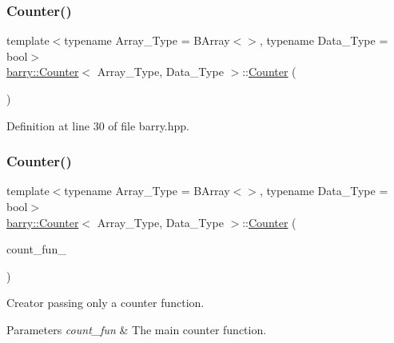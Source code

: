 \subsubsection{\texorpdfstring{Counter()}{Counter()}\hspace{0.1cm}{\footnotesize\ttfamily [1/3]}}
{\footnotesize\ttfamily template$<$typename Array\+\_\+\+Type  = B\+Array$<$$>$, typename Data\+\_\+\+Type  = bool$>$ \\
\hyperlink{classbarry_1_1_counter}{barry\+::\+Counter}$<$ Array\+\_\+\+Type, Data\+\_\+\+Type $>$\+::\hyperlink{classbarry_1_1_counter}{Counter} (\begin{DoxyParamCaption}{ }\end{DoxyParamCaption})\hspace{0.3cm}{\ttfamily [inline]}}



Definition at line 30 of file barry.\+hpp.

\mbox{\label{classbarry_1_1_counter_a33a032bc90384bf0e4178daeded5b10c}} 
\subsubsection{\texorpdfstring{Counter()}{Counter()}\hspace{0.1cm}{\footnotesize\ttfamily [2/3]}}
{\footnotesize\ttfamily template$<$typename Array\+\_\+\+Type  = B\+Array$<$$>$, typename Data\+\_\+\+Type  = bool$>$ \\
\hyperlink{classbarry_1_1_counter}{barry\+::\+Counter}$<$ Array\+\_\+\+Type, Data\+\_\+\+Type $>$\+::\hyperlink{classbarry_1_1_counter}{Counter} (\begin{DoxyParamCaption}\item[{\hyperlink{namespacebarry_abaaae3200da8e4b7faac3c04fe9c3081}{Counter\+\_\+fun\+\_\+type}$<$ Array\+\_\+\+Type, Data\+\_\+\+Type $>$}]{count\+\_\+fun\+\_\+ }\end{DoxyParamCaption})\hspace{0.3cm}{\ttfamily [inline]}}



Creator passing only a counter function. 


\begin{DoxyParams}{Parameters}
{\em count\+\_\+fun} & The main counter function. \\
\hline
\end{DoxyParams}


